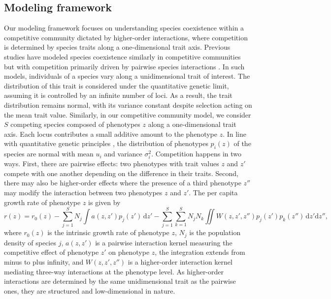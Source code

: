 \documentclass[11pt]{article}
\newcommand{\ud}{\mathrm{d}}
\begin{document}
\subsection{Modeling framework} \label{sec:framework}
Our modeling framework focuses on understanding species coexistence within a competitive community dictated by higher-order interactions, where competition is determined by species traits along a one-dimensional trait axis. Previous studies have modeled species coexistence similarly in competitive communities but with competition primarily driven by pairwise species interactions \citep{barabas_effect_2016,pastore_evolution_2021,kremer_coexistence_2013}. In such models, individuals of a species vary along a unidimensional trait of interest. The distribution of this trait is considered under the quantitative genetic limit, assuming it is controlled by an infinite number of loci. As a result, the trait distribution remains normal, with its variance constant despite selection acting on the mean trait value. Similarly, in our competitive community model, we consider $S$ competing species composed of phenotypes $z$ along a one-dimensional trait axis. Each locus contributes a small additive amount to the phenotype $z$. In line with quantitative genetic principles \citep{barton_infinitesimal_2017}, the distribution of phenotypes $p_i(z)$ of the species are normal with mean $u_i$ and variance $\sigma_i^2$.  Competition happens in two ways. First, there are pairwise effects: two phenotypes with trait values $z$ and $z'$ compete with one another depending on the difference in their traits. Second, there may also be higher-order effects where the presence of a third phenotype $z''$ may modify the interaction between two phenotypes $z$ and $z'$. The per capita growth rate of phenotype $z$ is given by
\begin{equation}
  \label{eq:pgr}
  r(z) = r_0(z) - \sum_{j=1}^S N_j \int a(z,z') p_j(z') \,\ud z' - \sum_{j=1}^S \sum_{k=1}^S N_j N_k
  \iint W(z,z',z'') p_j(z') p_k(z'') \,\ud z' \ud z'' ,
\end{equation}
where $r_0(z)$ is the intrinsic growth rate of phenotype $z$, $N_j$ is the population density of species $j$, $a(z,z')$ is a pairwise interaction kernel measuring the competitive effect of phenotype $z'$ on phenotype $z$, the integration extends from minus to plus infinity, and $W(z,z',z'')$ is a higher-order interaction kernel mediating three-way interactions at the phenotype level. As higher-order interactions are determined by the same unidimensional trait as the pairwise ones, they are structured and low-dimensional in nature. 
\end{document}
